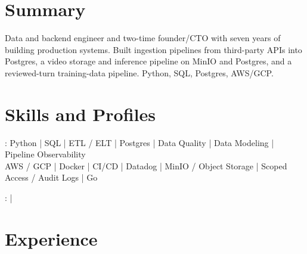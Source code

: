\documentclass[print]{jack-resume}
\begin{document}
\pagecolor{darkmodeBackground}


\begin{minipage}[t][1cm][t]{.03\textwidth}
    \hfill
\end{minipage}

\section{Summary}
Data and backend engineer and two-time founder/CTO with seven years of building production systems. Built ingestion pipelines from third-party APIs into Postgres, a video storage and inference pipeline on MinIO and Postgres, and a reviewed-turn training-data pipeline. Python, SQL, Postgres, AWS/GCP.
\sectionsep

\section{Skills and Profiles}
:
Python \hfill | \hfill
SQL \hfill | \hfill
ETL / ELT \hfill | \hfill
Postgres \hfill | \hfill
Data Quality \hfill | \hfill
Data Modeling \hfill | \hfill
Pipeline Observability \\
\hspace{1.0cm} AWS / GCP \hfill | \hfill
Docker \hfill | \hfill
CI/CD \hfill | \hfill
Datadog \hfill | \hfill
MinIO / Object Storage \hfill | \hfill
Scoped Access / Audit Logs \hfill | \hfill
Go \\

\raggedright{
    :
      \href{https://www.linkedin.com/in/jack-sturtevant/}{ \ExternalLink} |
     \href{https://github.com/jacksturt}{ \ExternalLink}}

\section{Experience}
\end{document}
